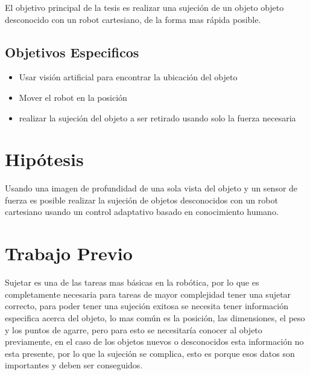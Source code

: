 El objetivo principal de la tesis es realizar una sujeción de un objeto objeto desconocido con un robot cartesiano, de la forma mas rápida posible.

\subsection{Objetivos Especificos}
\begin{itemize}
	 
\item Usar visión artificial para encontrar la ubicación del objeto


\item Mover el robot en la posición 


\item realizar la sujeción del objeto a ser retirado usando solo la fuerza necesaria


\end{itemize}





\section{Hipótesis}
Usando una imagen de profundidad de una sola vista del objeto y un sensor de fuerza es posible realizar la sujeción de objetos desconocidos con un robot cartesiano usando un control adaptativo basado en conocimiento humano.




\section{Trabajo Previo}
Sujetar es una de las tareas mas básicas en la robótica, por lo que es completamente necesaria para tareas de mayor complejidad tener una sujetar correcto, para poder tener una sujeción exitosa se necesita tener información especifica acerca del objeto, lo mas común es la posición, las dimensiones, el peso y los puntos de agarre, pero para esto se necesitaría conocer al objeto previamente, en el caso de los objetos nuevos o desconocidos esta información no esta presente, por lo que la sujeción se complica, esto es porque esos datos son importantes y deben ser conseguidos.


